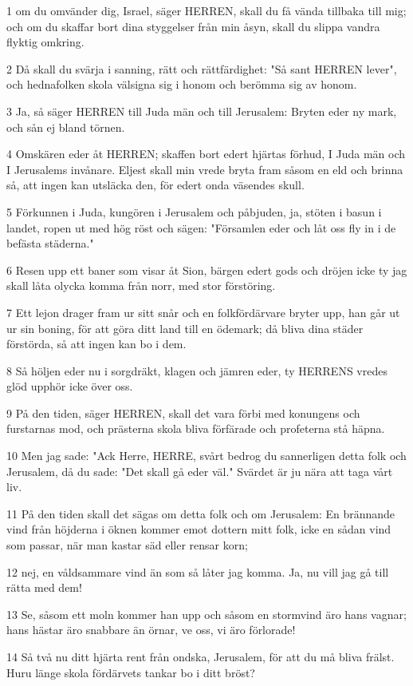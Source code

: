 \par 1 om du omvänder dig, Israel, säger HERREN, skall du få vända tillbaka till mig; och om du skaffar bort dina styggelser från min åsyn, skall du slippa vandra flyktig omkring.
\par 2 Då skall du svärja i sanning, rätt och rättfärdighet: "Så sant HERREN lever", och hednafolken skola välsigna sig i honom och berömma sig av honom.
\par 3 Ja, så säger HERREN till Juda män och till Jerusalem: Bryten eder ny mark, och sån ej bland törnen.
\par 4 Omskären eder åt HERREN; skaffen bort edert hjärtas förhud, I Juda män och I Jerusalems invånare. Eljest skall min vrede bryta fram såsom en eld och brinna så, att ingen kan utsläcka den, för edert onda väsendes skull.
\par 5 Förkunnen i Juda, kungören i Jerusalem och påbjuden, ja, stöten i basun i landet, ropen ut med hög röst och sägen: "Församlen eder och låt oss fly in i de befästa städerna."
\par 6 Resen upp ett baner som visar åt Sion, bärgen edert gods och dröjen icke ty jag skall låta olycka komma från norr, med stor förstöring.
\par 7 Ett lejon drager fram ur sitt snår och en folkfördärvare bryter upp, han går ut ur sin boning, för att göra ditt land till en ödemark; då bliva dina städer förstörda, så att ingen kan bo i dem.
\par 8 Så höljen eder nu i sorgdräkt, klagen och jämren eder, ty HERRENS vredes glöd upphör icke över oss.
\par 9 På den tiden, säger HERREN, skall det vara förbi med konungens och furstarnas mod, och prästerna skola bliva förfärade och profeterna stå häpna.
\par 10 Men jag sade: "Ack Herre, HERRE, svårt bedrog du sannerligen detta folk och Jerusalem, då du sade: "Det skall gå eder väl." Svärdet är ju nära att taga vårt liv.
\par 11 På den tiden skall det sägas om detta folk och om Jerusalem: En brännande vind från höjderna i öknen kommer emot dottern mitt folk, icke en sådan vind som passar, när man kastar säd eller rensar korn;
\par 12 nej, en våldsammare vind än som så låter jag komma. Ja, nu vill jag gå till rätta med dem!
\par 13 Se, såsom ett moln kommer han upp och såsom en stormvind äro hans vagnar; hans hästar äro snabbare än örnar, ve oss, vi äro förlorade!
\par 14 Så två nu ditt hjärta rent från ondska, Jerusalem, för att du må bliva frälst. Huru länge skola fördärvets tankar bo i ditt bröst?
